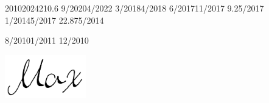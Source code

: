 \documentclass[11pt]{thyv}
\begin{document}
\begin{textblock}{5}
\begin{thyV}{2010}{2024}{21}{0.6\linewidth}
		 		{9/2020}{4/2022} 	{}
		 				{3/2018}{4/2018} 	{}
		 			{6/2017}{11/2017} 	{9.25/2017}
		 				{1/2014}{5/2017} 	{22.875/2014}

		 	{8/2010}{1/2011} 	{12/2010}
	\end{thyV}

	\end{textblock}



		\vfill
		\hfill\includegraphics[width=100pt]{signature2.png}
\end{document}
